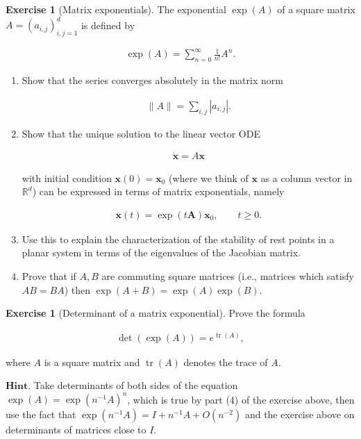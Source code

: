 \documentclass[11pt]{report}
\theoremstyle{plain}
\theoremstyle{definition}
\newtheorem{xexercise}[thm]{Exercise}
\begin{document}
\begin{xexercise}[Matrix exponentials]
The exponential $\exp(A)$ of a square matrix
$A=(a_{i,j})_{i,j=1}^d$ is defined by

\begin{align*}
\exp(A) = \sum_{n=0}^\infty \frac{1}{n!} A^n.
\end{align*}

\begin{enumerate}[label=\arabic*.]
\item Show that the series converges absolutely in the
matrix norm

\begin{align*}
\lVert A \rVert = \sum_{i,j} |a_{i,j}|.
\end{align*}

\item Show that the unique solution to the linear vector ODE

\begin{align*}
\dot{\mathbf{x}} = A \mathbf{x}
\end{align*}

\noindent with initial condition $\mathbf{x}(0) = \mathbf{x}_0$
(where we think of $\mathbf{x}$ as a column vector in
$\mathbb{R}^d$) can be expressed in terms of matrix
exponentials, namely

\begin{align*}
\mathbf{x}(t) = \exp\left(t \mathbf{A}\right) \mathbf{x}_0, \qquad t\ge 0.
\end{align*}

\item Use this to explain the characterization of the
stability of rest points in a planar system in terms
of the eigenvalues of the Jacobian matrix.

\item Prove that if $A, B$ are commuting square matrices
(i.e., matrices which satisfy $AB=BA$) then
$\exp(A+B)=\exp(A)\exp(B)$.
\end{enumerate}

\end{xexercise}

\begin{xexercise}[Determinant of a matrix exponential]
Prove the formula

\begin{align*}
\det\left( \exp(A)\right) = e^{\operatorname{tr}(A)},
\end{align*}

\noindent where $A$ is a square matrix and
$\operatorname{tr}(A)$ denotes the trace of $A$.

$\textbf{Hint.}$ Take determinants of both sides of
the equation $\exp(A)=\exp(n^{-1} A)^n$, which is true
by part (4) of the exercise above, then use the fact
that $\exp(n^{-1} A)=I+n^{-1}A + O(n^{-2})$ and the
exercise above on determinants of matrices close to
$I$.
\end{xexercise}
\end{document}
